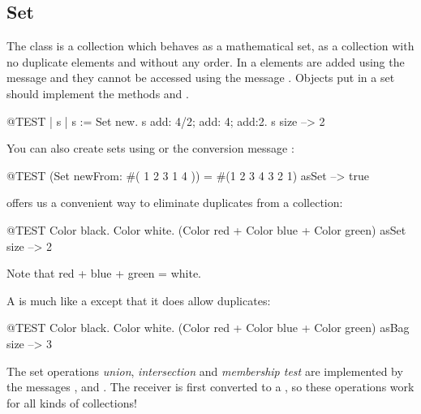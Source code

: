 \documentclass[a4paper,10pt,twoside]{book}
\begin{document}
\subsection{Set}
The class  is a collection which behaves as a mathematical set, \ie as a collection with no duplicate elements and without any order. In a  elements are added using the message  and they cannot be accessed using the message . Objects put in a set should implement the methods  and \ct{=}.

\begin{code}{@TEST | s | }
s := Set new.
s add: 4/2; add: 4; add:2.
s size --> 2
\end{code}

You can also create sets using  or the conversion message :

\begin{code}{@TEST}
(Set newFrom: #( 1 2 3 1 4 )) = #(1 2 3 4 3 2 1) asSet --> true
\end{code}

 offers us a convenient way to eliminate duplicates from a collection:
\begin{code}{@TEST}
{ Color black. Color white. (Color red + Color blue + Color green) } asSet size --> 2
\end{code}
\noindent
Note that red + blue + green = white.

A  is much like a  except that it does allow duplicates:
\begin{code}{@TEST}
{ Color black. Color white. (Color red + Color blue + Color green) } asBag size --> 3
\end{code}

The set operations \emph{union}, \emph{intersection} and \emph{membership test} are implemented by the  messages ,  and .
The receiver is first converted to a , so these operations work for all kinds of collections!

\end{document}
